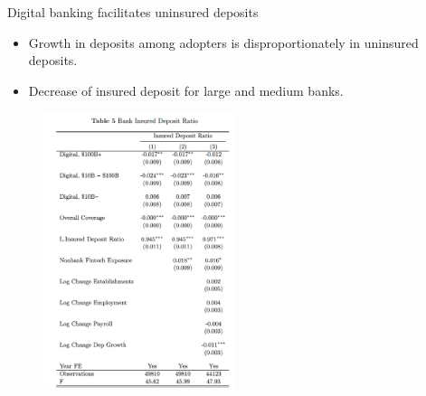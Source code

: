 \documentclass[notes,10pt, aspectratio=169]{beamer}
\begin{document}
\begin{frame}{Digital banking facilitates uninsured deposits}

\begin{itemize}
\item Growth in deposits among adopters is disproportionately in uninsured deposits.
\item Decrease of insured deposit for large and medium banks.
\end{itemize}


\begin{figure}
\centering
\includegraphics[width=0.5\textwidth]{imgs/tab5.png}
\end{figure}

\end{frame}
\end{document}
